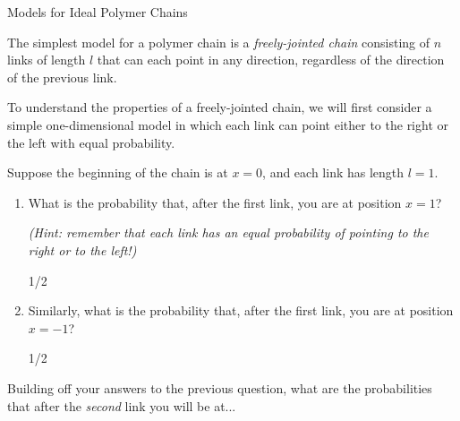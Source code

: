 \begin{activity}{Models for Ideal Polymer Chains}
\begin{instructornotes}
\end{instructornotes}


\begin{model}
\label{\labelbase:mdl:randomwalks}

	The simplest model for a polymer chain is a \emph{freely-jointed chain} consisting of $n$ links of length $l$ that can each point in any direction, regardless of the direction of the previous link.
	
	To understand the properties of a freely-jointed chain, we will first consider a simple one-dimensional model in which each link can point either to the right or the left with equal probability.

\end{model}


\begin{ctqs}

	\question Suppose the beginning of the chain is at $x=0$, and each link has length $l=1$.
	
		\begin{enumerate}
			\item What is the probability that, after the first link, you are at position $x=1$?
			
				\emph{(Hint: remember that each link has an equal probability of pointing to the right or to the left!)}
				
				\begin{solution}[0.5in]{}
				
					1/2
					
				\end{solution}
				
			\item Similarly, what is the probability that, after the first link, you are at position $x=-1$?
				
				\begin{solution}[0.5in]{}
				
					1/2				
				
				\end{solution}
			
		\end{enumerate}
		
	\question Building off your answers to the previous question, what are the probabilities that after the \emph{second} link you will be at...
	

\end{ctqs}
\end{activity}

